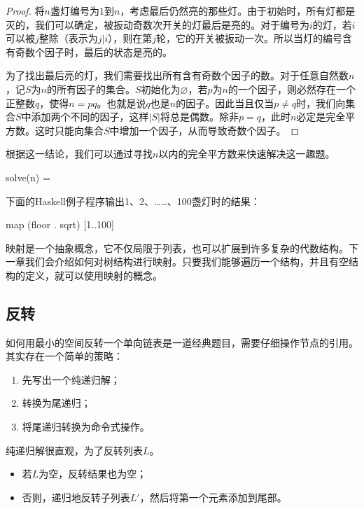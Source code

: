 \documentclass[b5paper]{ctexart}
\begin{document}
\begin{proof}
将$n$盏灯编号为1到$n$，考虑最后仍然亮的那些灯。由于初始时，所有灯都是灭的，我们可以确定，被扳动奇数次开关的灯最后是亮的。对于编号为$i$的灯，若$i$可以被$j$整除（表示为$j | i$），则在第$j$轮，它的开关被扳动一次。所以当灯的编号含有奇数个因子时，最后的状态是亮的。

为了找出最后亮的灯，我们需要找出所有含有奇数个因子的数。对于任意自然数$n$，记$S$为$n$的所有因子的集合。$S$初始化为$\varnothing$，若$p$为$n$的一个因子，则必然存在一个正整数$q$，使得$n = p q$。也就是说$q$也是$n$的因子。因此当且仅当$p \neq q$时，我们向集合$S$中添加两个不同的因子，这样$|S|$将总是偶数。除非$p = q$，此时$n$必定是完全平方数。这时只能向集合$S$中增加一个因子，从而导致奇数个因子。
\end{proof}

根据这一结论，我们可以通过寻找$n$以内的完全平方数来快速解决这一趣题。

\be
solve(n) = \lfloor {} \rfloor
\ee

下面的Haskell例子程序输出1、2、……、100盏灯时的结果：

\begin{Haskell}
map (floor . sqrt) [1..100]
\end{Haskell}

映射是一个抽象概念，它不仅局限于列表，也可以扩展到许多复杂的代数结构。下一章我们会介绍如何对树结构进行映射。只要我们能够遍历一个结构，并且有空结构的定义，就可以使用映射的概念。

\subsection{反转}
 \label{sec:reverse}

如何用最小的空间反转一个单向链表是一道经典题目，需要仔细操作节点的引用。其实存在一个简单的策略：

\begin{enumerate}
\item 先写出一个纯递归解；
\item 转换为尾递归；
\item 将尾递归转换为命令式操作。
\end{enumerate}

纯递归解很直观，为了反转列表$L$。

\begin{itemize}
\item 若$L$为空，反转结果也为空；
\item 否则，递归地反转子列表$L'$，然后将第一个元素添加到尾部。
\end{itemize}
\end{document}

